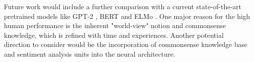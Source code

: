 \documentclass{article}
\begin{document}
Future work would include a further comparison with a current state-of-the-art pretrained models like GPT-2 \citep{radford2019language}, BERT \citep{Bert} and ELMo \citep{Elmo}. One major reason for the high human performance is the inherent "world-view" notion and commonsense knowledge, which is refined with time and experiences. Another potential direction to consider would be the incorporation of commonsense knowledge base and sentiment analysis units \citep{CommonSense} into the neural architecture. 


\end{document}
